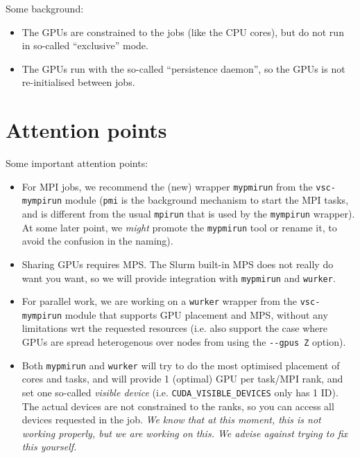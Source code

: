 Some background:
\begin{itemize}
\item The GPUs are constrained to the jobs (like the CPU cores), but do not run in so-called ``exclusive'' mode.
\item The GPUs run with the so-called ``persistence daemon'', so the GPUs is not re-initialised between jobs.
\end{itemize}






\section{Attention points}
\label{sec:gpu_ugent_attention_points}

Some important attention points:

\begin{itemize}
\item For MPI jobs, we recommend the (new) wrapper \lstinline|mypmirun| from the \lstinline|vsc-mympirun| module
  (\lstinline|pmi| is the background mechanism to start the MPI tasks,
  and is different from the usual \lstinline|mpirun| that is used by the \lstinline|mympirun| wrapper).
  At some later point, we \emph{might} promote the \lstinline|mypmirun| tool or rename it,
  to avoid the confusion in the naming).
\item Sharing GPUs requires MPS. The Slurm built-in MPS does not really do want you want, so we will provide integration with
  \lstinline|mypmirun| and \lstinline|wurker|.
\item For parallel work, we are working on a \lstinline|wurker| wrapper from the \lstinline|vsc-mympirun| module that supports
  GPU placement and MPS, without any limitations wrt the requested resources (i.e. also support the case where GPUs
  are spread heterogenous over nodes from using the \lstinline|--gpus Z| option).
\item Both \lstinline|mypmirun| and \lstinline|wurker| will try to do the most optimised placement of cores and tasks, and
  will provide 1 (optimal) GPU per task/MPI rank, and set one so-called \emph{visible device}
  (i.e. \lstinline|CUDA_VISIBLE_DEVICES| only has 1 ID). The actual devices are not constrained to the ranks,
  so you can access all devices requested in the job.
  \emph{We know that at this moment, this is not working properly, but we are working on this. We advise against trying to fix this yourself.}
\end{itemize}

